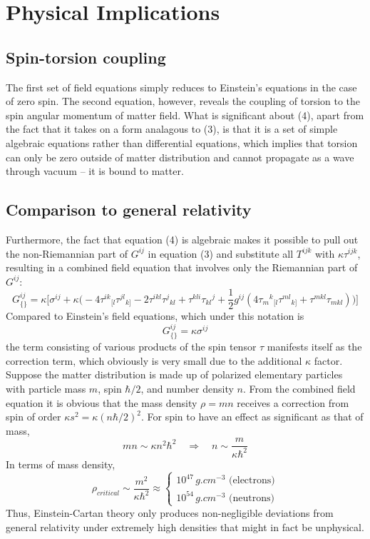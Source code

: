 \documentclass[12pt]{article}
\begin{document}
\section{Physical Implications}
\subsection{Spin-torsion coupling}
The first set of field equations simply reduces to Einstein's equations in the case of zero spin. The second equation, however, reveals the coupling of torsion to the spin angular momentum of matter field. What is significant about (4), apart from the fact that it takes on a form analagous to (3), is that it is a set of simple algebraic equations rather than differential equations, which implies that torsion can only be zero outside of matter distribution and cannot propagate as a wave through vacuum -- it is bound to matter.
\subsection{Comparison to general relativity}
Furthermore, the fact that equation (4) is algebraic makes it possible to pull out the non-Riemannian part of $G^{ij}$ in equation (3) and substitute all $T^{ijk}$ with $\kappa\tau^{ijk}$, resulting in a combined field equation that involves only the Riemannian part of $G^{ij}$\cite{hehl1976general}:
\[ G^{ij}_{\{\}}  = \kappa \Bigg[\sigma^{ij} + \kappa\Big( -4\tau^{ik}{}_{[l}\tau^{jl}{}_{k]} 
-2\tau^{ikl}\tau^j{}_{kl} + \tau^{kli}\tau_{kl}{}^j + \frac{1}{2}g^{ij}\left( 4\tau_m{}^k{}_{[l}\tau^{ml}{}_{k]} + \tau^{mkl}\tau_{mkl} \right)\Big) \Bigg] \]
Compared to Einstein's field equations, which under this notation is
\[G^{ij}_{\{\}} = \kappa \sigma^{ij} \]
the term consisting of various products of the spin tensor $\tau$ manifests itself as the correction term, which obviously is very small due to the additional $\kappa$ factor. Suppose the matter distribution is made up of polarized elementary particles with particle mass $m$, spin $\hbar/2$, and number density $n$. From the combined field equation it is obvious that the mass density $\rho = mn$ receives a correction from spin of order $\kappa s^2 = \kappa (n\hbar/2)^2$. For spin to have an effect as significant as that of mass,
\[ mn \sim \kappa n^2\hbar^2 \quad\Rightarrow\quad n \sim \frac{m}{\kappa \hbar^2} \]
In terms of mass density\cite{hehl1976general},
\[ \rho_{critical} \sim \frac{m^2}{\kappa \hbar^2} \approx \begin{cases}
10^{47} \, \si{g.cm^{-3}} \text{ (electrons)} \\
10^{54} \,\si{g.cm^{-3}} \text{ (neutrons)}
\end{cases}\]
Thus, Einstein-Cartan theory only produces non-negligible deviations from general relativity under extremely high densities that might in fact be unphysical. 

{}

\end{document}
